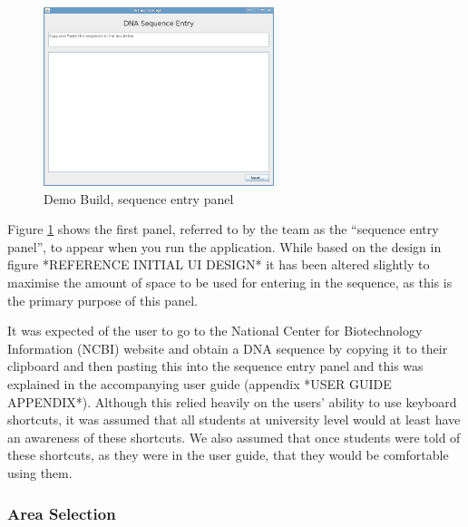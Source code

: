 \begin{figure}[h]
  \begin{center}
    \includegraphics[width=0.6\textwidth]{./images/demoBuild/sequenceEntry.png}
    \caption{
      \label{fig:demoBuild:sequenceEntry}
      Demo Build, sequence entry panel 
    }
  \end{center}
\end{figure}

Figure \ref{fig:demoBuild:sequenceEntry} shows the first panel,
referred to by the team as the ``sequence entry panel'', to
appear when you run the application.
While based on the design in figure *REFERENCE INITIAL UI DESIGN* it
has been altered slightly to maximise the amount of space to be used
for entering in the sequence, as this is the primary purpose of this
panel.

It was expected of the user to go to the National Center for
Biotechnology Information (NCBI) website and obtain a DNA sequence by
copying it to their clipboard and then pasting this into the sequence
entry panel and this was explained in the accompanying user guide
(appendix *USER GUIDE APPENDIX*).
Although this relied heavily on the users' ability to use keyboard
shortcuts, it was assumed that all students at university level would
at least have an awareness of these shortcuts.
We also assumed that once students were told of these shortcuts, as
they were in the user guide, that they would be comfortable using
them.


\subsubsection{Area Selection}


